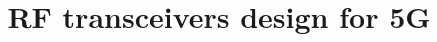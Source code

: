 \documentclass[onecolumn,draftcls,journal]{IEEEtran}
\begin{document}
%

\title{RF transceivers design for 5G}






\maketitle
\IEEEoverridecommandlockouts

%


%
\IEEEpeerreviewmaketitle
\vspace{-.9in}
\end{document}
